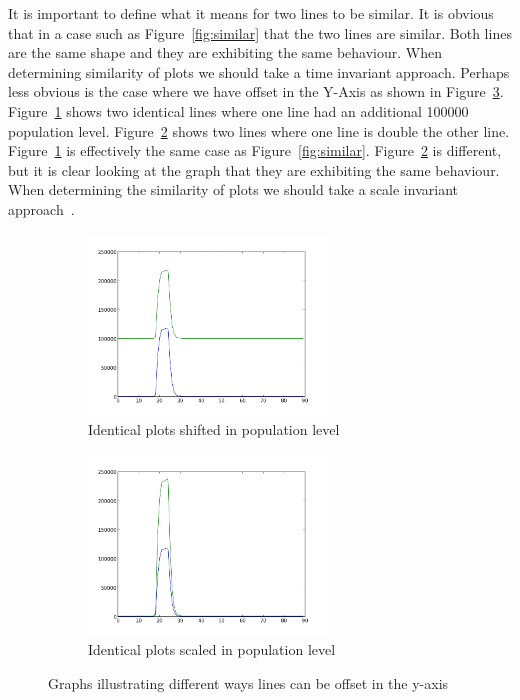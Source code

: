 It is important to define what it means for two lines to be similar.  It is obvious that in a case such as Figure~\ref{fig:similar} that the two lines are similar.  Both lines are the same shape and they are exhibiting the same behaviour.  When determining similarity of plots we should take a time invariant approach.  Perhaps less obvious is the case where we have offset in the Y-Axis as shown in Figure~\ref{fig:similar_y}.  Figure~\ref{fig:similar_1} shows two identical lines where one line had an additional 100000 population level.  Figure~\ref{fig:similar_2} shows two lines where one line is double the other line.  Figure~\ref{fig:similar_1} is effectively the same case as Figure~\ref{fig:similar}.  Figure~\ref{fig:similar_2} is different, but it is clear looking at the graph that they are exhibiting the same behaviour. When determining the similarity of plots we should take a scale invariant approach~\cite{esling}.

\begin{figure}[h!]
    \centering
    \begin{subfigure}[b]{0.6\textwidth}
        \centering
        \includegraphics[width=0.7\textwidth]{images/similar_plots_2.png}
        \caption{Identical plots shifted in population level}
        \label{fig:similar_1}
    \end{subfigure}

    \begin{subfigure}[b]{0.6\textwidth}
        \centering
        \includegraphics[width=0.7\textwidth]{images/similar_plots_3.png}
        \caption{Identical plots scaled in population level}
        \label{fig:similar_2}
    \end{subfigure}
    \caption{Graphs illustrating different ways lines can be offset in the y-axis}
    \label{fig:similar_y}
\end{figure}

